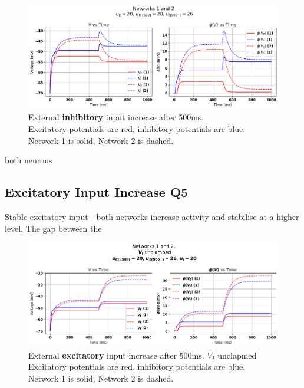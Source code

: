 \documentclass[10pt,twocolumn]{article}
\begin{document}
\begin{figure}
    \centering
    \captionsetup{justification=centering}
    \includegraphics[width=1\textwidth]{images/12-I_input.png}
    \caption{External \textbf{inhibitory} input increase after 500ms.\\
        Excitatory potentials are red, inhibitory potentials are blue.\\
        Network 1 is solid, Network 2 is dashed.}
    \label{fig:i-input}
\end{figure}

both neurons

\subsection{Excitatory Input Increase Q5}
Stable excitatory input - both networks increase activity and stabilise at a higher level.
The gap between the 
\begin{figure}
    \centering
    \captionsetup{justification=centering}
    \includegraphics[width=1\textwidth]{images/12-E_input.png}
    \caption{External \textbf{excitatory} input increase after 500ms. $V_I$ unclapmed \\
        Excitatory potentials are red, inhibitory potentials are blue.\\
        Network 1 is solid, Network 2 is dashed.}
    \label{fig:e-input-unclamped}
\end{figure}
\end{document}
